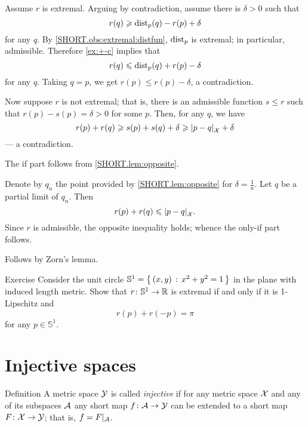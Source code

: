 Assume $r$ is extremal.
Arguing by contradiction, assume there is $\delta>0$ such that
\[r(q)\geqslant \mathrm{dist}_p(q)-r(p)+\delta\]
for any $q$.
By \ref{SHORT.obs:extremal:distfun}, $\mathrm{dist}_p$ is extremal; in particular, admissible.
Therefore \ref{ex:+-c} implies that
\[r(q)\leqslant \mathrm{dist}_p(q)+r(p)-\delta\]
for any $q$.
Taking $q=p$, we get $r(p)\le r(p)-\delta$, a contradiction.

Now suppose $r$ is not extremal; that is, there is an admissible function $s\le r$ such that $r(p)-s(p)=\delta>0$ for some $p$.
Then, for any $q$, we have
\[r(p)+r(q)\ge s(p)+s(q)+\delta\ge \dist{p}{q}{\spc{X}}+\delta\]
--- a contradiction.

The if part follows from \ref{SHORT.lem:opposite}.

Denote by $q_n$ the point provided by \ref{SHORT.lem:opposite} for $\delta=\tfrac1n$.
Let $q$ be a partial limit of $q_n$. 
Then 
\[r(p)+r(q)\le\dist{p}{q}{\spc{X}}.\]
Since $r$ is admissible, the opposite inequality holds;
whence the only-if part follows.

Follows by Zorn's lemma. 
\qeds

\begin{thm}{Exercise}\label{ex:circle}
Consider the unit circle $\mathbb{S}^1=\left\{\,{(x,y)}\,:\,{x^2+y^2=1}\,\right\}$ in the plane with induced length metric.
Show that $r\colon\mathbb{S}^1\to\mathbb{R}$ is extremal if and only if it is 1-Lipschitz and 
\[r(p)+r(-p)=\pi\] for any $p\in\mathbb{S}^1$.
\end{thm}

\section{Injective spaces}

\begin{thm}{Definition}\label{def:injective}
A metric space $\mathcal{Y}$ is called \emph{injective} if for any metric space $\mathcal{X}$ and any of its subspaces $\mathcal{A}$
any short map $f\colon\mathcal{A}\to \mathcal{Y}$ can be extended to a short map $F\colon\mathcal{X}\to \mathcal{Y}$;
that is, $f=F|_{\mathcal{A}}$.
\end{thm}

